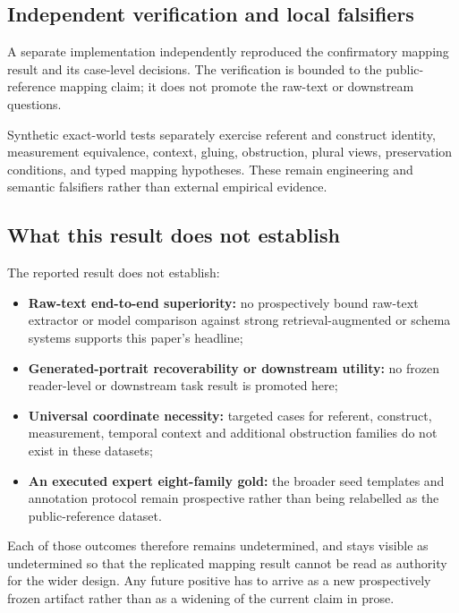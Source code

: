\subsection{Independent verification and local falsifiers}

A separate implementation independently reproduced the confirmatory mapping
result and its case-level decisions. The verification is bounded to the
public-reference mapping claim; it does not promote the raw-text or downstream
questions.

Synthetic exact-world tests separately exercise referent and construct
identity, measurement equivalence, context, gluing, obstruction, plural views,
preservation conditions, and typed mapping hypotheses. These remain
engineering and semantic falsifiers rather than external empirical evidence.

\subsection{What this result does not establish}

The reported result does not establish:

\begin{itemize}
  \item \textbf{Raw-text end-to-end superiority:} no prospectively bound
        raw-text extractor or model comparison against strong
        retrieval-augmented or schema systems supports this paper's headline;
  \item \textbf{Generated-portrait recoverability or downstream utility:} no
        frozen reader-level or downstream task result is promoted here;
  \item \textbf{Universal coordinate necessity:} targeted cases for referent,
        construct, measurement, temporal context and additional obstruction
        families do not exist in these datasets;
  \item \textbf{An executed expert eight-family gold:} the broader seed
        templates and annotation protocol remain prospective rather than being
        relabelled as the public-reference dataset.
\end{itemize}

Each of those outcomes therefore remains undetermined, and stays visible as
undetermined so that the replicated mapping result cannot be read as authority
for the wider design. Any future positive has to arrive as a new prospectively
frozen artifact rather than as a widening of the current claim in prose.

\endinput
